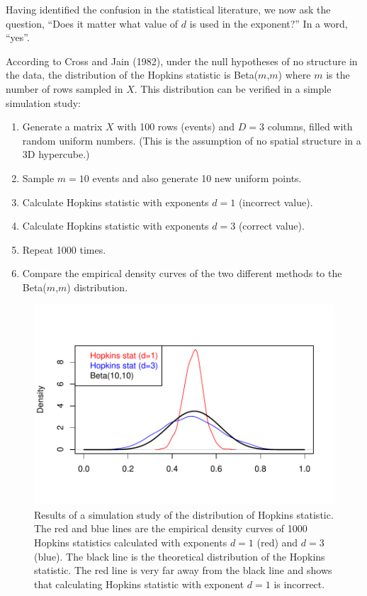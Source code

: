 Having identified the confusion in the statistical literature, we now ask the question, ``Does it matter what value of \(d\) is used in the exponent?'' In a word, ``yes''.

According to Cross and Jain (1982), under the null hypotheses of no structure in the data, the distribution of the Hopkins statistic is Beta(\(m\),\(m\)) where \(m\) is the number of rows sampled in \(X\). This distribution can be verified in a simple simulation study:

\begin{enumerate}
\def\labelenumi{\arabic{enumi}.}
\tightlist
\item
  Generate a matrix \(X\) with 100 rows (events) and \(D=3\) columns, filled with random uniform numbers. (This is the assumption of no spatial structure in a 3D hypercube.)
\item
  Sample \(m=10\) events and also generate 10 new uniform points.
\item
  Calculate Hopkins statistic with exponents \(d=1\) (incorrect value).
\item
  Calculate Hopkins statistic with exponents \(d=3\) (correct value).
\item
  Repeat 1000 times.
\item
  Compare the empirical density curves of the two different methods to the Beta(\(m\),\(m\)) distribution.
\end{enumerate}

\begin{figure}

{\centering \includegraphics[width=0.9\linewidth]{RJ-2022-055_files/figure-latex/simulation-1} 

}

\caption{Results of a simulation study of the distribution of Hopkins statistic. The red and blue lines are the empirical density curves of 1000 Hopkins statistics calculated with exponents $d=1$ (red) and $d=3$ (blue). The black line is the theoretical distribution of the Hopkins statistic. The red line is very far away from the black line and shows that calculating Hopkins statistic with exponent $d=1$ is incorrect.}\label{fig:simulation}
\end{figure}

